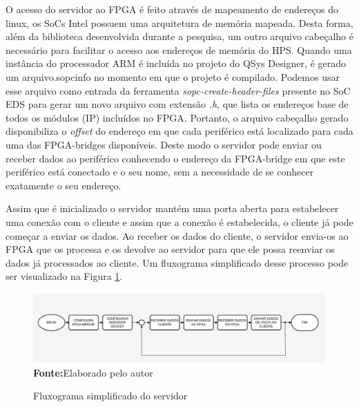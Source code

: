 O acesso do servidor ao FPGA é feito através de mapeamento de endereços do linux, os SoCs Intel possuem uma arquitetura de memória mapeada. Desta forma, além da biblioteca desenvolvida durante a pesquisa, um outro arquivo cabeçalho é necessário para facilitar o acesso aos endereços de memória do HPS\@. Quando uma instância do processador ARM é incluída no projeto do QSys Designer, é gerado um arquivo.sopcinfo no momento em que o projeto é compilado. Podemos usar esse arquivo como entrada da ferramenta \textit{sopc-create-header-files} presente no SoC EDS para gerar um novo arquivo com extensão \textit{.h}, que lista os endereços base de todos os módulos (IP) incluídos no FPGA\@. Portanto, o arquivo cabeçalho gerado disponibiliza o \textit{offset} do endereço em que cada periférico está localizado para cada uma das FPGA-bridges disponíveis. Deste modo o servidor pode enviar ou receber dados ao periférico conhecendo o endereço da FPGA-bridge em que este periférico está conectado e o seu nome, sem a necessidade de se conhecer exatamente o seu endereço.

Assim que é inicializado o servidor mantém uma porta aberta para estabelecer uma conexão com o cliente e assim que a conexão é estabelecida, o cliente já pode começar a enviar os dados. Ao receber os dados do cliente, o servidor envia-os ao FPGA que os processa e os devolve ao servidor para que ele possa reenviar os dados já processados ao cliente. Um fluxograma simplificado desse processo pode ser visualizado na Figura \ref{fig:fluxoServidor}.

\begin{figure}[ht]
	\caption{Fluxograma simplificado do servidor}
	\begin{center}
		\includegraphics[scale=0.41]{imagens/fluxogramaServidor.png}\\
		{\small \textbf{Fonte:}Elaborado pelo autor}
    \end{center}\label{fig:fluxoServidor}
\end{figure} 

